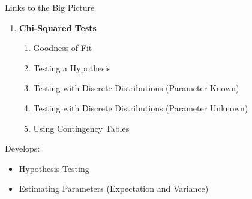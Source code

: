 \documentclass[fleqn]{article}
\newcommand{\bookletunittitle}{Chi-Squared Tests}                %
\newcommand{\unitprefix}{FS}                                     %
\begin{document}
\begin{mybox2}[colbacktitle=WildStrawberry]{Links to the Big Picture}
    \begin{enumerate}[label*=\bfseries \unitprefix\arabic*., leftmargin=*]
        \item \textbf{\bookletunittitle}
        \begin{enumerate}[label*=\bfseries\arabic*]
            \item Goodness of Fit
            \item Testing a Hypothesis
            \item Testing with Discrete Distributions (Parameter Known)
            \item Testing with Discrete Distributions (Parameter Unknown)
            \item Using Contingency Tables
        \end{enumerate}
    \end{enumerate}
    Develops:
    \begin{itemize}
        \item Hypothesis Testing
        \item Estimating Parameters (Expectation and Variance)
    \end{itemize}
    \vspace{1mm}
\end{mybox2}
\end{document}

